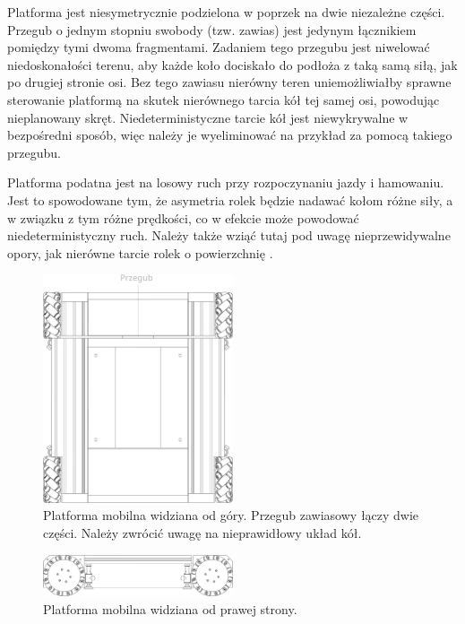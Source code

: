 Platforma jest niesymetrycznie podzielona w poprzek na dwie niezależne części.
Przegub o jednym stopniu swobody (tzw. zawias) jest jedynym łącznikiem pomiędzy tymi dwoma fragmentami.
Zadaniem tego przegubu jest niwelować niedoskonałości terenu, aby każde koło dociskało do podłoża z taką samą siłą, jak po drugiej stronie osi.
Bez tego zawiasu nierówny teren uniemożliwiałby sprawne sterowanie platformą na skutek nierównego tarcia kół tej samej osi, powodując nieplanowany skręt.
Niedeterministyczne tarcie kół jest niewykrywalne w bezpośredni sposób, więc należy je wyeliminować na przykład za pomocą takiego przegubu.

Platforma podatna jest na losowy ruch przy rozpoczynaniu jazdy i hamowaniu.
Jest to spowodowane tym, że asymetria rolek będzie nadawać kołom różne siły, a w związku z tym różne prędkości, co w efekcie może powodować niedeterministyczny ruch.
Należy także wziąć tutaj pod uwagę nieprzewidywalne opory, jak nierówne tarcie rolek o powierzchnię \cite{braking}.

\begin{figure}[H]
\centering
 \includegraphics[width=0.5\textwidth]{graphics/base_top.pdf}
\caption{Platforma mobilna widziana od góry. Przegub zawiasowy łączy dwie części. Należy zwrócić uwagę na nieprawidłowy układ kół.}
\end{figure} 

\begin{figure}[H]
\centering
 \includegraphics[width=0.5\textwidth]{graphics/base_side.pdf}
\caption{Platforma mobilna widziana od prawej strony.}
\end{figure} 

